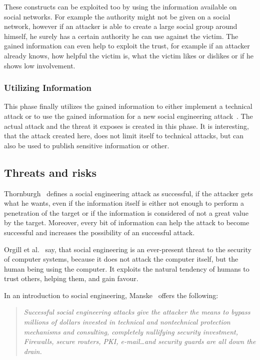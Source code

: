 These constructs can be exploited too by using the information available on
social networks. For example the authority might not be given on a social
network, however if an attacker is able to create a large social group around
himself, he surely has a certain authority he can use against the victim. The
gained information can even help to exploit the trust, for example if an
attacker already knows, how helpful the victim is, what the victim likes or
dislikes or if he shows low involvement.

\subsubsection{Utilizing Information}

This phase finally utilizes the gained information to either implement a
technical attack or to use the gained information for a new social engineering
attack~\cite{thornburgh2004}. The actual attack and the threat it exposes is
created in this phase. It is interesting, that the attack created here, does
not limit itself to technical attacks, but can also be used to publish
sensitive information or other.

\subsection{Threats and risks}

Thornburgh~\cite{thornburgh2004} defines a social engineering attack as
successful, if the attacker gets what he wants, even if the information itself
is either not enough to perform a penetration of the target or if the
information is considered of not a great value by the target. Moreover, every
bit of information can help the attack to become successful and increases the
possibility of an successful attack.

Orgill et al.~\cite{orgill2004} say, that social engineering is an ever-present
threat to the security of computer systems, because it does not attack the
computer itself, but the human being using the computer. It exploits the
natural tendency of humans to trust others, helping them, and gain favour.

In an introduction to social engineering, Manske~\cite{manske2000} offers the following:

\begin{quote}
\textit{Successful social engineering attacks give the attacker the means to bypass
millions of dollars invested in technical and nontechnical protection
mechanisms and consulting, completely nullifying security investment,
Firewalls, secure routers, PKI, e-mail\dots and security guards are all down
the drain.}
\end{quote}

